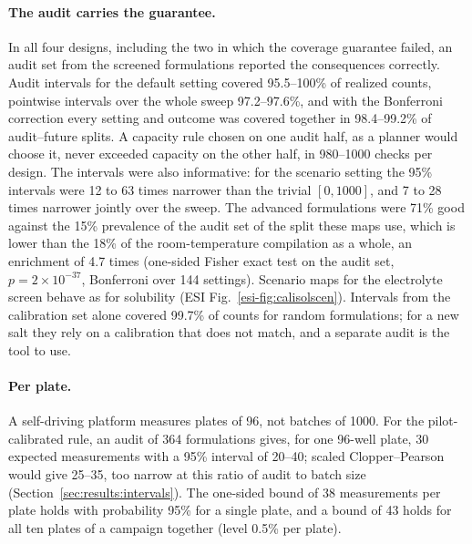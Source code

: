 \documentclass[twocolumn,10pt]{article}
\begin{document}
\paragraph{The audit carries the guarantee.} In all four designs, including the two in which the coverage guarantee failed, an audit set from the screened formulations reported the consequences correctly. Audit intervals for the default setting covered 95.5--100\% of realized counts, pointwise intervals over the whole sweep 97.2--97.6\%, and with the Bonferroni correction every setting and outcome was covered together in 98.4--99.2\% of audit--future splits. A capacity rule chosen on one audit half, as a planner would choose it, never exceeded capacity on the other half, in 980--1000 checks per design. The intervals were also informative: for the scenario setting the 95\% intervals were 12 to 63 times narrower than the trivial $[0,1000]$, and 7 to 28 times narrower jointly over the sweep. The advanced formulations were 71\% good against the 15\% prevalence of the audit set of the split these maps use, which is lower than the 18\% of the room-temperature compilation as a whole, an enrichment of 4.7 times (one-sided Fisher exact test on the audit set, $p=2\times10^{-37}$, Bonferroni over 144 settings). Scenario maps for the electrolyte screen behave as for solubility (ESI Fig.~\ref{esi-fig:calisolscen}). Intervals from the calibration set alone covered 99.7\% of counts for random formulations; for a new salt they rely on a calibration that does not match, and a separate audit is the tool to use.

\paragraph{Per plate.} A self-driving platform measures plates of 96, not batches of 1000. For the pilot-calibrated rule, an audit of 364 formulations gives, for one 96-well plate, 30 expected measurements with a 95\% interval of 20--40; scaled Clopper--Pearson would give 25--35, too narrow at this ratio of audit to batch size (Section~\ref{sec:results:intervals}). The one-sided bound of 38 measurements per plate holds with probability 95\% for a single plate, and a bound of 43 holds for all ten plates of a campaign together (level 0.5\% per plate).
\end{document}
